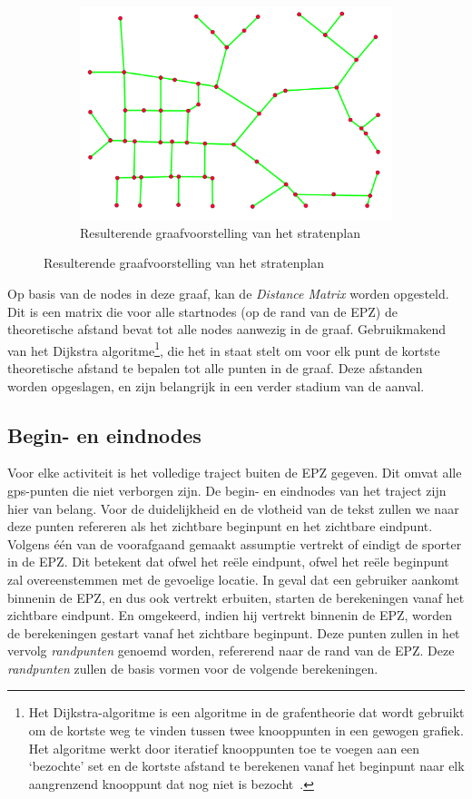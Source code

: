 \begin{figure}[h]
\begin{subfigure}[b]{.4\textwidth}
        \includegraphics[width=1\textwidth]{fig/RoadGraph/Graph.png}
        \caption{Resulterende graafvoorstelling van het stratenplan}
    \end{subfigure}
\end{figure}

Op basis van de nodes in deze graaf, kan de \textit{Distance Matrix} worden
opgesteld. Dit is een matrix die voor alle startnodes (op de rand van de
\ac{EPZ}) de theoretische afstand bevat tot alle nodes aanwezig in de graaf.
Gebruikmakend van het Dijkstra algoritme\footnote{Het Dijkstra-algoritme is een
    algoritme in de grafentheorie dat wordt gebruikt om de kortste weg te vinden
    tussen twee knooppunten in een gewogen grafiek. Het algoritme werkt door
    iteratief knooppunten toe te voegen aan een `bezochte' set en de kortste
    afstand te berekenen vanaf het beginpunt naar elk aangrenzend knooppunt dat nog
    niet is bezocht~\cite{dijkstra}.}, die het in staat stelt om voor elk punt de
kortste theoretische afstand te bepalen tot alle punten in de graaf. Deze
afstanden worden opgeslagen, en zijn belangrijk in een verder stadium van de
aanval.

\subsection{Begin- en eindnodes}
Voor elke activiteit is het volledige traject buiten de \ac{EPZ} gegeven. Dit
omvat alle \ac{gps}-punten die niet verborgen zijn. De begin- en eindnodes van
het traject zijn hier van belang. Voor de duidelijkheid en de vlotheid van de
tekst zullen we naar deze punten refereren als het zichtbare beginpunt en het
zichtbare eindpunt. Volgens één van de voorafgaand gemaakt assumptie vertrekt
of eindigt de sporter in de \ac{EPZ}. Dit betekent dat ofwel het reële
eindpunt, ofwel het reële beginpunt zal overeenstemmen met de gevoelige
locatie. In geval dat een gebruiker aankomt binnenin de \ac{EPZ}, en dus ook
vertrekt erbuiten, starten de berekeningen vanaf het zichtbare eindpunt. En
omgekeerd, indien hij vertrekt binnenin de \ac{EPZ}, worden de berekeningen
gestart vanaf het zichtbare beginpunt. Deze punten zullen in het vervolg
\textit{randpunten} genoemd worden, refererend naar de rand van de \ac{EPZ}.
Deze \textit{randpunten} zullen de basis vormen voor de volgende berekeningen.

